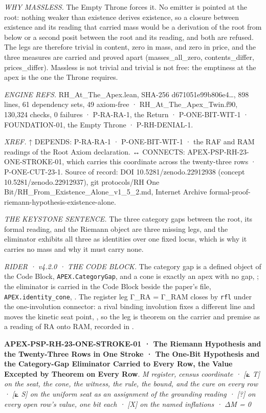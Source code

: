 \documentclass[10pt,twocolumn]{article}
\begin{document}
\emph{WHY MASSLESS.} The Empty Throne forces it. No emitter is pointed
at the root: nothing weaker than existence derives existence, so a
closure between existence and its reading that carried mass would be a
derivation of the root from below or a second posit between the root and
its reading, and both are refused. The legs are therefore trivial in
content, zero in mass, and zero in price, and the three measures are
carried and proved apart (masses\_all\_zero, contents\_differ,
prices\_differ). Massless is not trivial and trivial is not free: the
emptiness at the apex is the one the Throne requires.

\emph{ENGINE REFS.} RH\_At\_The\_Apex.lean, SHA-256
d671051e99b806e4\ldots, 898 lines, 61 dependency sets, 49 axiom-free ·
RH\_At\_The\_Apex\_Twin.f90, 130,324 checks, 0 failures · P-RA-RA-1, the
Return · P-ONE-BIT-WIT-1 · FOUNDATION-01, the Empty Throne ·
P-RH-DENIAL-1.

\emph{XREF.} ↑ DEPENDS: P-RA-RA-1 · P-ONE-BIT-WIT-1 · the RAF and RAM
readings of the Root Axiom declaration. ↔ CONNECTS:
APEX-PSP-RH-23-ONE-STROKE-01, which carries this coordinate across the
twenty-three rows · P-ONE-CUT-23-1. Source of record: DOI
10.5281/zenodo.22912938 (concept 10.5281/zenodo.22912937), git
protocols/RH One Bit/RH\_From\_Existence\_Alone\_v1\_5\_2.md, Internet
Archive formal-proof-riemann-hypothesis-existence-alone.

\emph{THE KEYSTONE SENTENCE.} The three category gaps between the root,
its formal reading, and the Riemann object are three missing legs, and
the eliminator exhibits all three as identities over one fixed locus,
which is why it carries no mass and why it must carry none.

\emph{RIDER · v4.2.0 · THE CODE BLOCK.} The category gap is a defined
object of the Code Block, \texttt{APEX.CategoryGap}, and a cone is
exactly an apex with no gap,
\texttt{}; the eliminator is carried
in the Code Block beside the paper's file, \texttt{APEX.identity\_cone},
\texttt{}. The register leg Γ\_RA
= Γ\_RAM closes by \texttt{rfl} under the one-involution connector: a
rival binding involution fixes a different line and moves the kinetic
seat point,
\texttt{}, so the
leg is theorem on the carrier and premise as a reading of RA onto RAM,
recorded in \texttt{}.

\textbf{APEX-PSP-RH-23-ONE-STROKE-01 · The Riemann Hypothesis and the
Twenty-Three Rows in One Stroke · The One-Bit Hypothesis and the
Category-Gap Eliminator Carried to Every Row, the Value Excepted by
Theorem on Every Row}. \emph{M register, census coordinate · {[}⟀ T{]}
on the seat, the cone, the witness, the rule, the bound, and the cure on
every row · {[}⟀ S{]} on the uniform seat as an assignment of the
grounding reading · {[}?{]} on every open row's value, one bit each ·
{[}X{]} on the named inflations · ΔM = 0}
\end{document}

